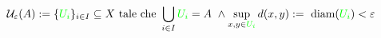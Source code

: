 \documentclass[preview]{standalone}
\begin{document}
\begin{align*}
\mathcal{U}_{\varepsilon}(A) :=  \{\textcolor{green}{U_i}\}_{i \in I} \subseteq X \text{ tale che } \bigcup_{i \in I} \textcolor{green}{U_i} = A  \ \land \sup_{x,y \in \textcolor{green}{U_i}} d(x,y) := \text{ diam}(\textcolor{green}{U_i}) < \varepsilon
\end{align*}
\end{document}
